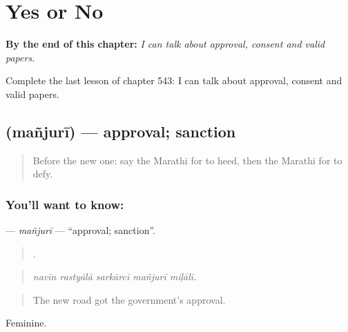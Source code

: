 
\chapter{Yes or No}
\label{ch:mr-yes-or-no}

\begin{chapteropening}
\textbf{By the end of this chapter:} \emph{I can talk about approval, consent and valid papers.}

Complete the last lesson of chapter 543: I can talk about approval, consent and valid papers.
\end{chapteropening}

\section[\texorpdfstring{\mr{मंजुरी} (mañjurī)}{मंजुरी (mañjurī)}]{ (mañjurī) — approval; sanction}

\label{lesson:MR-C543-manjuri}



\begin{quote}
Before the new one: say the Marathi for to heed, then the Marathi for to defy.
\end{quote}

\subsection*{You'll want to know: }
\textbf{} — \emph{mañjurī} — \textquotedblleft{}approval; sanction\textquotedblright{}.

\begin{quote}
    .
\end{quote}

\begin{quote}
\emph{navīn rastyālā sarkārcī mañjurī miḷālī.}
\end{quote}

\begin{quote}
The new road got the government's approval.
\end{quote}

Feminine.

